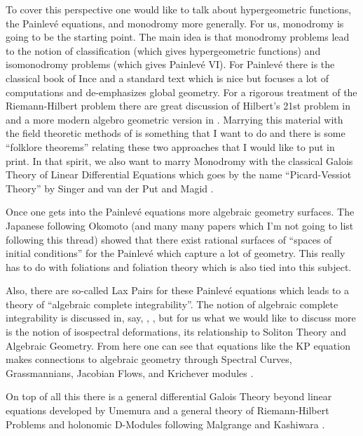 \documentclass[12pt]{book}
\numberwithin{equation}{section}
\theoremstyle{definition}
\theoremstyle{remark}
\begin{document}
To cover this perspective one would like to talk about hypergeometric functions, the Painlev\'{e} equations, and monodromy more generally. 
For us, monodromy is going to be the starting point.
The main idea is that monodromy problems lead to the notion of classification (which gives hypergeometric functions) and isomonodromy problems (which gives Painlev\'e VI). 
For Painlev\'e there is the classical book of Ince \cite{Ince1944} and a standard text \cite{Iwasaki1991} which is nice but focuses a lot of computations and de-emphasizes global geometry.
For a rigorous treatment of the Riemann-Hilbert problem there are great discussion of Hilbert's 21st problem in \cite{Borel1987} and a more modern algebro geometric version in \cite{Deligne1970}.
Marrying this material with the field theoretic methods of \cite{Buium1986} is something that I want to do and there is some ``folklore theorems'' relating these two approaches that I would like to put in print.
In that spirit, we also want to marry Monodromy with the classical Galois Theory of Linear Differential Equations which goes by the name ``Picard-Vessiot Theory'' by Singer and van der Put \cite{Put2003} and Magid \cite{Magid1994}.


Once one gets into the Painlev\'{e} equations more algebraic geometry surfaces. The Japanese following  Okomoto \cite{Okamoto1987b,Okamoto1987,Okamoto1986, Okamoto1987a} (and many many papers which I'm not going to list following this thread) showed that there exist rational surfaces of ``spaces of initial conditions'' for the Painlev\'{e} which capture a lot of geometry. 
This really has to do with foliations and foliation theory which is also tied into this subject. 

Also, there are so-called Lax Pairs for these Painlev\'{e} equations which leads to a theory of ``algebraic complete integrability''. 
The notion of algebraic complete integrability is discussed in, say, \cite{Beauville1990}, \cite{Adler2004}, but for us what we would like to discuss more is the notion of isospectral deformations, its relationship to Soliton Theory and Algebraic Geometry.
From here one can see that equations like the KP equation makes connections to algebraic geometry through Spectral Curves, Grassmannians, Jacobian Flows, and Krichever modules \cite{Mulase1994} \cite{Segal1998} \cite{Sato1983} \cite{Miwa2000}.

On top of all this there is a general differential Galois Theory beyond linear equations  developed by Umemura \cite{Umemura2011} and a general theory of Riemann-Hilbert  Problems and holonomic D-Modules following Malgrange and Kashiwara \cite{Borel1987}.
\end{document}
